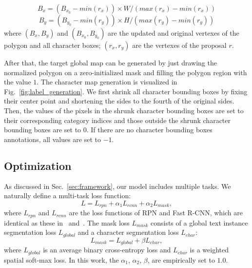 \documentclass[runningheads]{llncs}
\begin{document}
\begin{equation}
B_{x}=(B_{x_0}-min(r_{x})) \times W / (max(r_{x})-min(r_{x}))
\end{equation}
\begin{equation}
B_{y}=(B_{y_0}-min(r_{y})) \times H / (max(r_{y})-min(r_{y}))
\end{equation}
where $(B_{x},B_{y})$ and $(B_{x_0},B_{y_0})$ are the updated and original vertexes of the polygon and all character boxes; $(r_{x}, r_{y})$ are the vertexes of the proposal $r$.

After that, the target global map can be generated by just drawing the normalized polygon on a zero-initialized mask and filling the polygon region with the value $1$. 
The character map generation is visualized in Fig.~\ref{fig:label_generation}. We first shrink all character bounding boxes by fixing their center point and shortening the sides to the fourth of the original sides. Then, the values of the pixels in the shrunk character bounding boxes are set to their corresponding category indices and those outside the shrunk character bounding boxes are set to $0$. If there are no character bounding boxes annotations, all values are set to $-1$.

\subsection{Optimization}
As discussed in Sec.~\ref{sec:framework}, our model includes multiple tasks. We naturally define a multi-task loss function:
\begin{equation}
L = L_{rpn} + \alpha_1 L_{rcnn} + \alpha_2 L_{mask},
\end{equation}
where $L_{rpn}$ and $L_{rcnn}$ are the loss functions of RPN and Fast R-CNN, which are identical as these in~\cite{ren2015faster} and~\cite{fastrcnn}. 
The mask loss $L_{mask}$ consists of a global text instance segmentation loss $L_{global}$ and a character segmentation loss $L_{char}$:
\begin{equation}
L_{mask} = L_{global} + \beta L_{char},
\end{equation}
where $L_{global}$ is an average binary cross-entropy loss and $L_{char}$ is a weighted spatial soft-max loss. In this work, the $\alpha_1$, $\alpha_2$, $\beta$, are empirically set to $1.0$.
\end{document}
